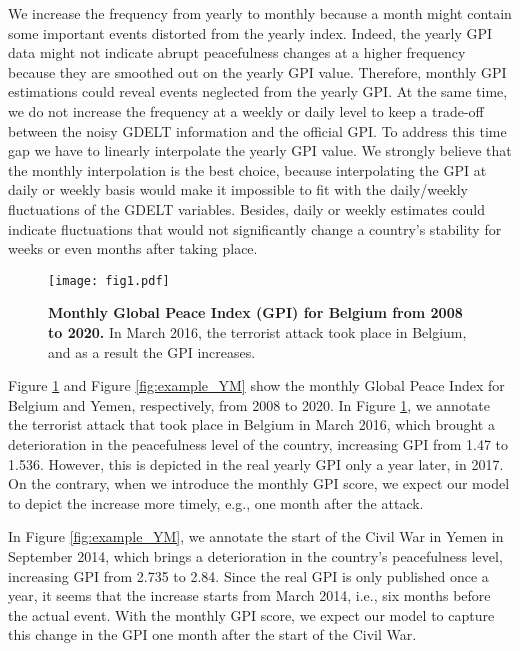 \documentclass{bmcart}
\begin{document}
We increase the frequency from yearly to monthly because a month might contain some important events distorted from the yearly index.
Indeed, the yearly GPI data might not indicate abrupt peacefulness changes at a higher frequency because they are smoothed out on the yearly GPI value. 
Therefore, monthly GPI estimations could reveal events neglected from the yearly GPI. 
At the same time, we do not increase the frequency at a weekly or daily level to keep a trade-off between the noisy GDELT information and the official GPI. To address this time gap we have to linearly interpolate the yearly GPI value. We strongly believe that the monthly interpolation is the best choice, because interpolating the GPI at daily or weekly basis would make it impossible to fit with the daily/weekly fluctuations of the GDELT variables. Besides, daily or weekly estimates could indicate fluctuations that would not significantly change a country's stability for weeks or even months after taking place. 

\begin{figure}[h!]
\centering
\texttt{[image: fig1.pdf]}
\caption{\textbf{Monthly Global Peace Index (GPI) for Belgium from 2008 to 2020.} In March 2016, the terrorist attack took place in Belgium, and as a result the GPI increases.}
\label{fig:example_BE}
\end{figure}


Figure \ref{fig:example_BE} and Figure \ref{fig:example_YM} show the monthly Global Peace Index for Belgium and Yemen, respectively, from 2008 to 2020. 
In Figure \ref{fig:example_BE}, we annotate the terrorist attack that took place in Belgium in March 2016, which brought a deterioration in the peacefulness level of the country, increasing GPI from 1.47 to 1.536. 
However, this is depicted in the real yearly GPI only a year later, in 2017. 
On the contrary, when we introduce the monthly GPI score, we expect our model to depict the increase more timely, e.g., one month after the attack. 

In Figure \ref{fig:example_YM}, we annotate the start of the Civil War in Yemen in September 2014, which brings a deterioration in the country's peacefulness level, increasing GPI from 2.735 to 2.84. 
Since the real GPI is only published once a year, it seems that the increase starts from March 2014, i.e., six months before the actual event. 
With the monthly GPI score, we expect our model to capture this change in the GPI one month after the start of the Civil War. 
\end{document}
